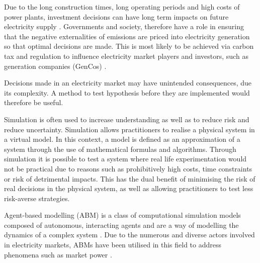
 Due to the long construction times, long operating periods and high costs of power plants, investment decisions can have long term impacts on future electricity supply \cite{Chappin2017}. Governments and society, therefore have a role in ensuring that the negative externalities of emissions are priced into electricity generation so that optimal decisions are made. This is most likely to be achieved via carbon tax and regulation to influence electricity market players and investors, such as generation companies (GenCos) \cite{May2002}.


Decisions made in an electricity market may have unintended consequences, due its complexity. A method to test hypothesis before they are implemented would therefore be useful.

Simulation is often used to increase understanding as well as to reduce risk and reduce uncertainty. Simulation allows practitioners to realise a physical system in a virtual model. In this context, a model is defined as an approximation of a system through the use of mathematical formulas and algorithms. Through simulation it is possible to test a system where real life experimentation would not be practical due to reasons such as prohibitively high costs, time constraints or risk of detrimental impacts. This has the dual benefit of minimising the risk of real decisions in the physical system, as well as allowing practitioners to test less risk-averse strategies.

Agent-based modelling (ABM) is a class of computational simulation models composed of autonomous, interacting agents and are a way of modelling the dynamics of a complex system \cite{MacAl2010}. Due to the numerous and diverse actors involved in electricity markets, ABMs have been utilised in this field to address phenomena such as market power \cite{Ringler2016a}.


